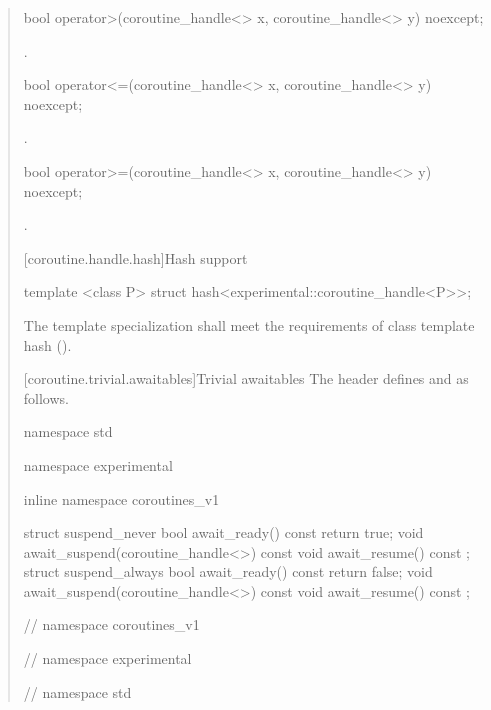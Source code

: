\begin{quote}
\begin{itemdecl}
  bool operator>(coroutine_handle<> x, coroutine_handle<> y) noexcept;
\end{itemdecl}

\begin{itemdescr}
  \pnum
  \returns {}.
\end{itemdescr}

\begin{itemdecl}
  bool operator<=(coroutine_handle<> x, coroutine_handle<> y) noexcept;
\end{itemdecl}

\begin{itemdescr}
  \pnum
  \returns {}.
\end{itemdescr}

\begin{itemdecl}
  bool operator>=(coroutine_handle<> x, coroutine_handle<> y) noexcept;
\end{itemdecl}

\begin{itemdescr}
  \pnum
  \returns {}.
\end{itemdescr}

[coroutine.handle.hash]{Hash support}

\begin{itemdecl}
  template <class P> struct hash<experimental::coroutine_handle<P>>;
\end{itemdecl}

\begin{itemdescr}
  \pnum
The template specialization shall meet the requirements of class template hash ().
\end{itemdescr}

[coroutine.trivial.awaitables]{Trivial awaitables}
The header  defines  and  as follows.
\begin{codeblock}
namespace std {
namespace experimental {
inline namespace coroutines_v1 {

  struct suspend_never {
    bool await_ready() const { return true; }
    void await_suspend(coroutine_handle<>) const {}
    void await_resume() const {}
  };
  struct suspend_always {
    bool await_ready() const { return false; }
    void await_suspend(coroutine_handle<>) const {}
    void await_resume() const {}
  };

} // namespace coroutines_v1
} // namespace experimental
} // namespace std
\end{codeblock}
\end{quote}

